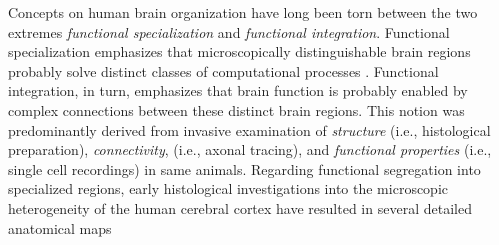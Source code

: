 \documentclass{article} %
\begin{document}
Concepts on human brain organization have long been torn
between the two extremes
\textit{functional specialization} and \textit{functional integration}.
Functional specialization emphasizes that microscopically distinguishable
brain regions probably solve distinct classes of computational processes
\citep{kanwisher2010functional}.
Functional integration, in turn, emphasizes that brain function
is probably enabled by complex connections between these
distinct brain regions.
%
This notion was predominantly derived from
invasive examination of \textit{structure} (i.e., histological preparation),
\textit{connectivity}, (i.e., axonal tracing),
and \textit{functional properties}
(i.e., single cell recordings) in same animals.
Regarding functional segregation into specialized regions,
early histological investigations into the microscopic heterogeneity of
the human cerebral cortex have resulted
in several detailed anatomical maps
\end{document}
